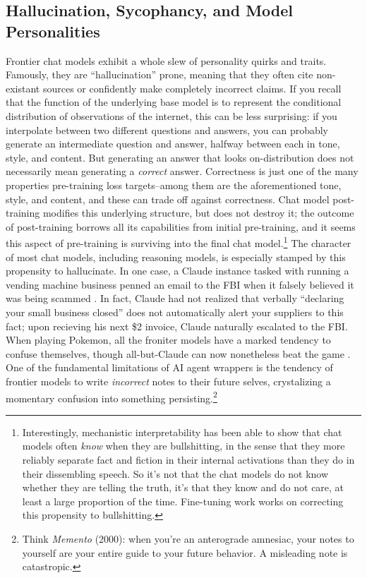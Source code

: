 \subsection{Hallucination, Sycophancy, and Model Personalities}
Frontier chat models exhibit a whole slew of personality quirks and traits.
Famously, they are ``hallucination'' prone, meaning that they often cite
non-existant sources or confidently make completely incorrect claims. If you
recall that the function of the underlying base model is to represent the
conditional distribution of observations of the internet, this can be less
surprising: if you interpolate between two different questions and answers, you
can probably generate an intermediate question and answer, halfway between each
in tone, style, and content. But generating an answer that looks
on-distribution does not necessarily mean generating a \emph{correct} answer.
Correctness is just one of the many properties pre-training loss targets--among
them are the aforementioned tone, style, and content, and these can trade off
against correctness. Chat model post-training modifies this underlying
structure, but does not destroy it; the outcome of post-training borrows all
its capabilities from initial pre-training, and it seems this aspect of
pre-training is surviving into the final chat model.\footnote{Interestingly,
mechanistic interpretability has been able to show that chat models often
\emph{know} when they are bullshitting, in the sense that they more reliably
separate fact and fiction in their internal activations than they do in their
dissembling speech. So it's not that the chat models do not know whether they
are telling the truth, it's that they know and do not care, at least a large
proportion of the time. Fine-tuning work works on correcting this propensity to
bullshitting.} The character of most chat models, including reasoning models,
is especially stamped by this propensity to hallucinate. In one case, a Claude
instance tasked with running a vending machine business penned an email to the
FBI when it falsely believed it was being scammed \cite{backlund2025vending}.
In fact, Claude had not realized that verbally ``declaring your small business
closed'' does not automatically alert your suppliers to this fact; upon
recieving his next \$2 invoice, Claude naturally escalated to the FBI. When
playing Pokemon, all the froniter models have a marked tendency to confuse
themselves, though all-but-Claude can now nonetheless beat the game \cite{}.
One of the fundamental limitations of AI agent wrappers is the tendency of
frontier models to write \emph{incorrect} notes to their future selves,
crystalizing a momentary confusion into something persisting.\footnote{Think
\emph{Memento} (2000): when you're an anterograde amnesiac, your notes to
yourself are your entire guide to your future behavior. A misleading note is
catastropic.}

